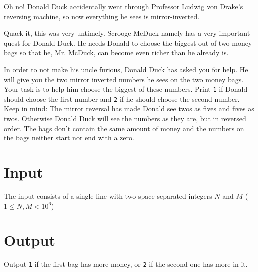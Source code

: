 Oh no! Donald Duck accidentally went through Professor Ludwig von Drake’s reversing machine, so now everything he sees is mirror-inverted.

Quack-it, this was very untimely. Scrooge McDuck namely has a very important quest for Donald Duck. He needs Donald to choose the biggest out of two money bags so that he, Mr. McDuck, can become even richer than he already is.

In order to not make his uncle furious, Donald Duck has asked you for help. He will give you the two
mirror inverted numbers he sees on the two money bags. Your task is to help him choose the biggest
of these numbers. Print \texttt{1} if Donald should choose the first number and \texttt{2} if he should choose the
second number. Keep in mind: The mirror reversal has made Donald see twos as fives and fives as twos.
Otherwise Donald Duck will see the numbers as they are, but in reversed order. The bags don't
contain the same amount of money and the numbers on the bags neither start nor end with a zero.

\section*{Input}
The input consists of a single line with two space-separated integers $N$ and $M$ ($1
\leq N, M < 10^6$)

\section*{Output}
Output \texttt{1} if the first bag has more money, or \texttt{2} if the second one has more in it.
